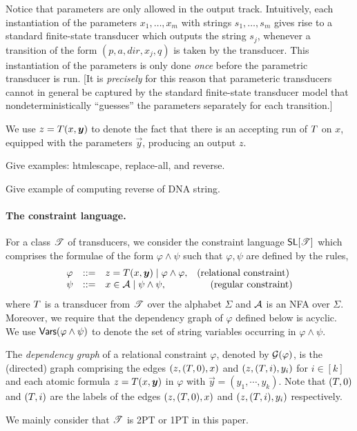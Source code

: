 Notice that parameters are only allowed in the output track.
Intuitively, each instantiation of the parameters $x_1,\ldots,x_m$ with strings 
$s_1,\ldots,s_m$ gives rise to a standard finite-state transducer which outputs
the string $s_j$, whenever a transition of the form $(p,a,dir,x_j,q)$ is
taken by the transducer. This instantiation of the parameters is only done 
\emph{once} before the parametric transducer is run. [It is \emph{precisely}
for this reason that parameteric transducers cannot in general be captured by 
the standard finite-state transducer model that nondeterministically ``guesses''
the parameters separately for each transition.]  

We use $z = \Transducer(x, \vec{y})$ to denote the fact that there is an accepting run of $T$ on $x$, equipped with the parameters $\vec{y}$, producing an output $z$.


Give examples: htmlescape, replace-all, and reverse.

Give example of computing reverse of DNA string.

\paragraph{The constraint language.}
For a class $\mathscr{T}$ of transducers, we consider the constraint language $\textsf{SL}[\mathscr{T}]$ which comprises the formulae of the form $\varphi \wedge \psi$ such that $\varphi,\psi$ are defined by the rules,
\[
\begin{array}{l l l r}
\varphi &::=& z = \Transducer(x, \vec{y}) \mid \varphi \wedge \varphi, &  \hfill  \mbox{(relational constraint) } \\ 
\psi &::= & x \in \Aut \mid \psi \wedge \psi, & \hfill \mbox{(regular constraint)} 
\end{array}
\]
where $T$ is a transducer from $\mathscr{T}$ over the alphabet $\Sigma$ and $\mathcal{A}$ is an NFA over $\Sigma$. Moreover, we require that the dependency graph of $\varphi$ defined below is acyclic. We use $\mathsf{Vars}(\varphi \wedge \psi)$ to denote the set of string variables occurring in $\varphi \wedge \psi$.

The \emph{dependency graph} of a relational constraint $\varphi$, denoted by $\mathcal{G}(\varphi)$, is the (directed) graph comprising the edges $(z, (T, 0), x)$ and $(z, (T, i), y_i)$ for $i\in [k]$ and  each atomic formula $z = \Transducer(x, \vec{y})$ in $\varphi$ with $\vec{y}=(y_1, \cdots, y_k)$. Note that $(T, 0)$ and $(T, i)$ are the labels of the edges $(z, (T, 0), x)$ and $(z, (T, i), y_i)$ respectively.
 
We mainly consider that $\mathscr{T}$ is 2PT or 1PT in this paper.
